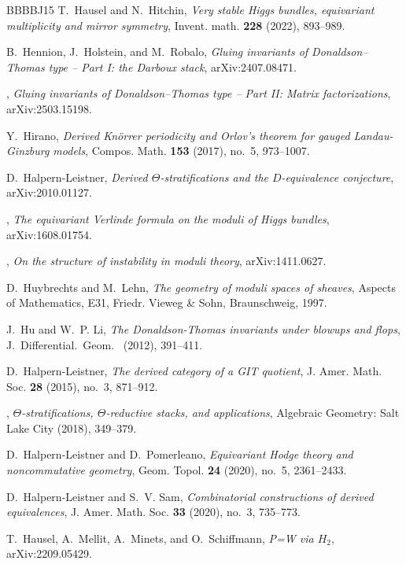 \documentclass [11pt,oneside,a4paper,mathscr]{amsart}
\theoremstyle{definition}
\begin{document}
\begin{thebibliography}{BBBBJ15}
T.~Hausel and N.~Hitchin, \emph{Very stable {H}iggs bundles, equivariant multiplicity and mirror symmetry}, Invent. math. \textbf{228} (2022), 893--989.

B.~Hennion, J.~Holstein, and M.~Robalo, \emph{Gluing invariants of {D}onaldson--{T}homas type -- {P}art {I}: the {D}arboux stack}, arXiv:2407.08471.

\bysame, \emph{Gluing invariants of {D}onaldson--{T}homas type -- {P}art {II}: {M}atrix factorizations}, arXiv:2503.15198.

Y.~Hirano, \emph{Derived {K}n\"orrer periodicity and {O}rlov's theorem for gauged {L}andau-{G}inzburg models}, Compos. Math. \textbf{153} (2017), no.~5, 973--1007.

D.~Halpern-Leistner, \emph{Derived {$\Theta$}-stratifications and the {$D$}-equivalence conjecture}, arXiv:2010.01127.

\bysame, \emph{The equivariant {V}erlinde formula on the moduli of {H}iggs bundles}, arXiv:1608.01754.

\bysame, \emph{On the structure of instability in moduli theory}, arXiv:1411.0627.

D.~Huybrechts and M.~Lehn, \emph{The geometry of moduli spaces of sheaves}, Aspects of Mathematics, E31, Friedr. Vieweg \& Sohn, Braunschweig, 1997.

J.~Hu and W.~P. Li, \emph{The {D}onaldson-{T}homas invariants under blowups and flops}, J.~Differential.~Geom.~ (2012), 391--411.

D.~Halpern-Leistner, \emph{The derived category of a {GIT} quotient}, J. Amer. Math. Soc. \textbf{28} (2015), no.~3, 871--912.

\bysame, \emph{{$\Theta$}-stratifications, {$\Theta$}-reductive stacks, and applications}, Algebraic Geometry: Salt Lake City (2018), 349–379.

D.~Halpern-Leistner and D.~Pomerleano, \emph{Equivariant {H}odge theory and noncommutative geometry}, Geom. Topol. \textbf{24} (2020), no.~5, 2361--2433.

D.~Halpern-Leistner and S.~V. Sam, \emph{Combinatorial constructions of derived equivalences}, J. Amer. Math. Soc. \textbf{33} (2020), no.~3, 735--773.

T.~Hausel, A.~Mellit, A.~Minets, and O.~Schiffmann, \emph{{P}={W} via ${H}_2$}, arXiv:2209.05429.


\end{thebibliography}
\end{document}
